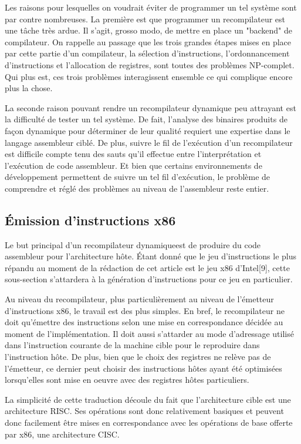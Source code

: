 \documentclass{article} %
\begin{document}
Les raisons pour lesquelles on voudrait éviter de programmer un tel système sont par contre nombreuses. La première est que programmer un recompilateur est une tâche très ardue. Il s'agit, grosso modo, de mettre en place un "backend" de compilateur. On rappelle au passage que les trois grandes étapes mises en place par cette partie d'un compilateur, la sélection d'instructions, l'ordonnancement d'instructions et l'allocation de registres, sont toutes des problèmes NP-complet. Qui plus est, ces trois problèmes interagissent ensemble ce qui complique encore plus la chose. 

La seconde raison pouvant rendre un recompilateur dynamique peu attrayant est la difficulté de tester un tel système. De fait, l'analyse des binaires produits de façon dynamique pour déterminer de leur qualité requiert une expertise dans le langage assembleur ciblé. De plus, suivre le fil de l'exécution d'un recompilateur est difficile compte tenu des sauts qu'il effectue entre l'interprétation et l'exécution de code assembleur. Et bien que certains environnements de développement permettent de suivre un tel fil d'exécution, le problème de comprendre et réglé des problèmes au niveau de l'assembleur reste entier.

\subsection{Émission d'instructions x86}
Le but principal d'un recompilateur dynamiqueest de produire du code assembleur pour l'architecture hôte. Étant donné que le jeu d'instructions le plus répandu au moment de la rédaction de cet article est le jeu x86 d'Intel[9], cette sous-section s'attardera à la génération d'instructions pour ce jeu en particulier. 

Au niveau du recompilateur, plus particulièrement au niveau de l'émetteur d'instructions x86, le travail est des plus simples. En bref, le recompilateur ne doit qu'émettre des instructions selon une mise en correspondance décidée au moment de l'implémentation. Il doit aussi s'attarder au mode d'adressage utilisé dans l'instruction courante de la machine cible pour le reproduire dans l'instruction hôte. De plus, bien que le choix des registres ne relève pas de l'émetteur, ce dernier peut choisir des instructions hôtes ayant été optimisées lorsqu'elles sont mise en oeuvre avec des registres hôtes particuliers. 

La simplicité de cette traduction découle du fait que l'architecture cible est une architecture RISC. Ses opérations sont donc relativement basiques et peuvent donc facilement être mises en correspondance avec les opérations de base offerte par x86, une architecture CISC. 
\end{document}

